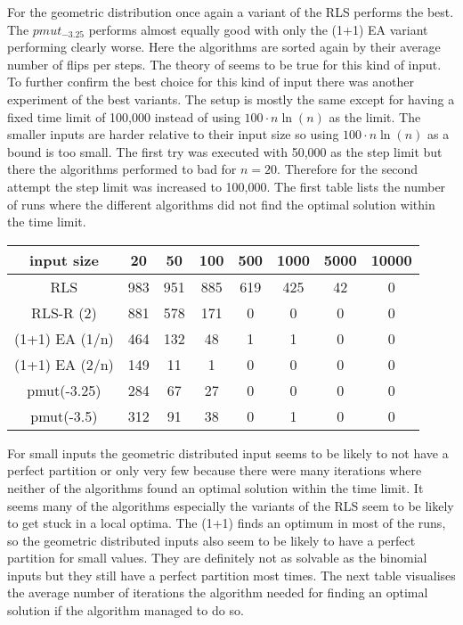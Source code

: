 For the geometric distribution once again a variant of the RLS performs the best.
The $pmut_{-3.25}$ performs almost equally good with only the (1+1) EA variant performing clearly worse.
Here the algorithms are sorted again by their average number of flips per steps. The theory of seems to be true for this kind of input.\newline
To further confirm the best choice for this kind of input there was another experiment of the best variants.
The setup is mostly the same except for having a fixed time limit of 100,000 instead of using $100 \cdot n\ln(n)$ as the limit.
The smaller inputs are harder relative to their input size so using $100 \cdot n\ln(n)$ as a bound is too small.
The first try was executed with 50,000 as the step limit but there the algorithms performed to bad for $n=20$.
Therefore for the second attempt the step limit was increased to 100,000.
The first table lists the number of runs where the different algorithms did not find the optimal solution within the time limit.

\begin{tabular}{cccccccc}

      input size    & 20  & 50  & 100 & 500 & 1000 & 5000 & 10000 \\\hline
      RLS           & 983 & 951 & 885 & 619 & 425  & 42   & 0     \\
      RLS-R (2)      & 881 & 578 & 171 & 0   & 0    & 0    & 0     \\
      (1+1) EA (1/n) & 464 & 132 & 48  & 1   & 1    & 0    & 0     \\
      (1+1) EA (2/n) & 149 & 11  & 1   & 0   & 0    & 0    & 0     \\
      pmut(-3.25)   & 284 & 67  & 27  & 0   & 0    & 0    & 0     \\
      pmut(-3.5)    & 312 & 91  & 38  & 0   & 1    & 0    & 0     \\
\end{tabular}

For small inputs the geometric distributed input seems to be likely to not have a perfect partition or only very few because there were many iterations where neither of the algorithms found an optimal solution within the time limit.
It seems many of the algorithms especially the variants of the RLS seem to be likely to get stuck in a local optima.
The (1+1) finds an optimum in most of the runs, so the geometric distributed inputs also seem to be likely to have a perfect partition for small values.
They are definitely not as solvable as the binomial inputs but they still have a perfect partition most times.
The next table visualises the average number of iterations the algorithm needed for finding an optimal solution if the algorithm managed to do so.

